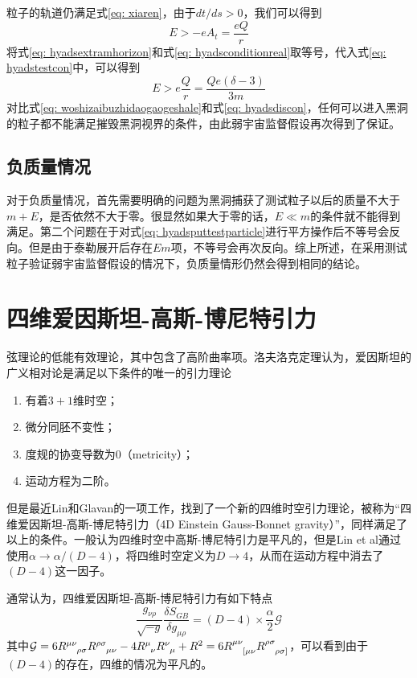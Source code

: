粒子的轨道仍满足式\eqref{eq: xiaren}，由于$dt/ds>0$，我们可以得到
\begin{equation}\label{eq: hyadstestcon}
    E>-eA_t=\frac{eQ}{r}
\end{equation}
将式\eqref{eq: hyadsextramhorizon}和式\eqref{eq: hyadsconditionreal}取等号，代入式\eqref{eq: hyadstestcon}中，可以得到
\begin{equation}\label{eq: woshizaibuzhidaogaogeshale}
    E > e\frac{Q}{r}=\frac{Q e \left(\delta-3\right)}{3 m} 
\end{equation}
对比式\eqref{eq: woshizaibuzhidaogaogeshale}和式\eqref{eq: hyadsdiscon}，任何可以进入黑洞的粒子都不能满足摧毁黑洞视界的条件，由此弱宇宙监督假设再次得到了保证。
\subsection{负质量情况}
对于负质量情况，首先需要明确的问题为黑洞捕获了测试粒子以后的质量不大于$m+E$，是否依然不大于零。很显然如果大于零的话，$E \ll m$的条件就不能得到满足。第二个问题在于对式\eqref{eq: hyadsputtestparticle}进行平方操作后不等号会反向。但是由于泰勒展开后存在$E m $项，不等号会再次反向。综上所述，在采用测试粒子验证弱宇宙监督假设的情况下，负质量情形仍然会得到相同的结论。

\section{四维爱因斯坦-高斯-博尼特引力}
弦理论的低能有效理论，其中包含了高阶曲率项。洛夫洛克定理认为，爱因斯坦的广义相对论是满足以下条件的唯一的引力理论\citep{lanczos1938remarkable,lovelock1971einstein,lovelock1972four}
\begin{enumerate}
    \item 有着$3+1$维时空；
    \item 微分同胚不变性；
    \item 度规的协变导数为0（metricity）；
    \item 运动方程为二阶。
\end{enumerate}

但是最近Lin和Glavan的一项工作，找到了一个新的四维时空引力理论，被称为“四维爱因斯坦-高斯-博尼特引力（4D Einstein Gauss-Bonnet gravity）”，同样满足了以上的条件\citep{glavan2020einstein}。一般认为四维时空中高斯-博尼特引力是平凡的，但是Lin et al通过使用$\alpha\rightarrow \alpha/\left(D-4\right)$，将四维时空定义为$D\rightarrow 4$，从而在运动方程中消去了$\left(D-4\right)$这一因子。

通常认为，四维爱因斯坦-高斯-博尼特引力有如下特点
\begin{equation}
    \frac{g_{\nu \rho}}{\sqrt{-g}}\frac{\delta S_{GB}}{\delta g_{\mu \rho}}=\left(D-4\right)\times \frac{\alpha}{2}\mathcal{G}
\end{equation}
其中$\mathcal{G}=6R\indices{^{\mu \nu}_{\rho \sigma}}R\indices{^{\rho \sigma}_{\mu \nu}}-4R\indices{^{\mu}_{\nu}}R\indices{^{\nu}_{\mu}}+R^2=6R\indices{^{\mu \nu}_{[\mu \nu}}R\indices{^{\rho \sigma}_{\rho \sigma]}}$，可以看到由于$\left(D-4\right)$的存在，四维的情况为平凡的。

